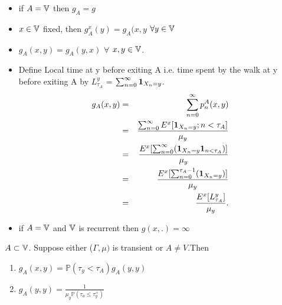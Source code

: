 \documentclass[main]{subfiles}
\begin{document}
\begin{notation}

    \begin{itemize}

        \item if $A=\mathbb{V}$ then $g_A=g$
        \item $x \in \mathbb{V}$ fixed, then $g_A^x(y)= g_A(x,y $ $\forall y \in \mathbb{V}$

    \end{itemize}

    \begin{obs}
        \begin{itemize}
            \item $g_A(x,y) = g_A(y,x)$ $\forall$ $x,y \in \mathbb{V}$.
            \item
                  Define Local time at y before exiting A i.e. time spent by the walk at y before exiting A by $L_{\tau_A}^y$ = $\sum_{n=0}^{\infty}  \mathbf{1}_{X_n=y}$.
                  \begin{eqnarray*}
                      g_A(x,y)&=& \sum_{n=0}^{\infty} p_n^A(x,y) \\
                      &=& \frac{\sum_{n=0}^{\infty} E^x[\mathbf{1}_{X_n=y}; n<\tau_A ]}{\mu_y} \\
                      &=&\frac{E^x[\sum_{n=0}^{\infty} (\mathbf{1}_{X_n=y} \mathbf{1}_{n<\tau_A}) ]}{\mu_y} \\
                      &=&\frac{E^x[\sum_{n=0}^{\tau_A-1} (\mathbf{1}_{X_n=y}) ]}{\mu_y} \\
                      &=&\frac{E^x[L_{\tau_A}^y]}{\mu_y}.
                  \end{eqnarray*}

            \item if $A=\mathbb{V}$ and $\mathbb{V}$ is recurrent then $g(x,.)=\infty$
        \end{itemize}
    \end{obs}
\end{notation}

\begin{theorem}
    $A\subset \mathbb{V}$. Suppose either ($\Gamma, \mu)$ is transient or $A \neq V$.Then
    \begin{enumerate}
        \item $g_A(x,y)= \mathbb{P} (\tau_y < \tau_A)g_A(y,y)$
        \item $g_A(y,y)=\frac{1}{\mu_y \mathbb{P}(\tau_a \leq \tau_y^+)}$
    \end{enumerate}
\end{theorem}
\end{document}
